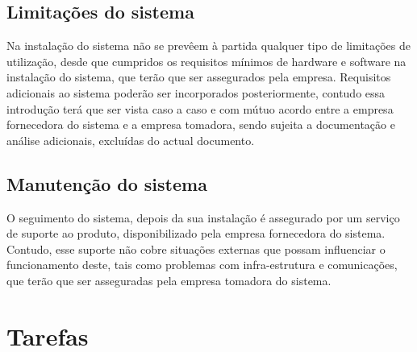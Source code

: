 \subsection{Limitações do sistema}
Na instalação do sistema não se prevêem à partida qualquer tipo de limitações de utilização, desde que cumpridos os requisitos mínimos de hardware e software na instalação do sistema, que terão que ser assegurados pela empresa.
Requisitos adicionais ao sistema poderão ser incorporados posteriormente, contudo essa introdução terá que ser vista caso a caso e com mútuo acordo entre a empresa fornecedora do sistema e a empresa tomadora, sendo sujeita a documentação e análise adicionais, excluídas do actual documento.

\subsection{Manutenção do sistema}
O seguimento do sistema, depois da sua instalação é assegurado por um serviço de suporte ao produto, disponibilizado pela empresa fornecedora do sistema. Contudo, esse suporte não cobre situações externas que possam influenciar o funcionamento deste, tais como problemas com infra-estrutura e comunicações, que terão que ser asseguradas pela empresa tomadora do sistema. 

\section{Tarefas}
